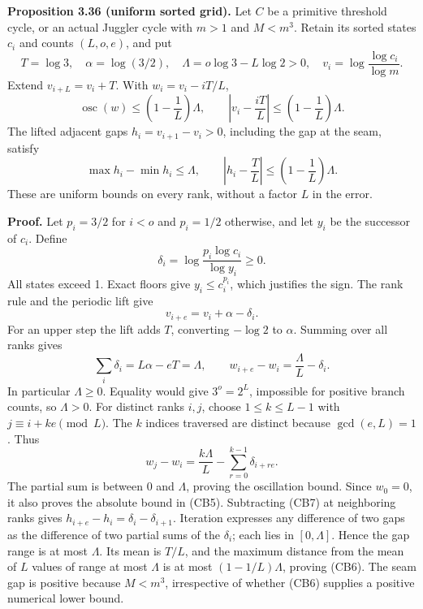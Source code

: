 \documentclass[12pt]{article}
\begin{document}
\textbf{Proposition 3.36 (uniform sorted grid).} Let \(C\) be a
primitive threshold cycle, or an actual Juggler cycle with \(m>1\) and
\(M<m^3\). Retain its sorted states \(c_i\) and counts \((L,o,e)\), and
put \[
T=\log3,\quad \alpha=\log(3/2),\quad
\Lambda=o\log3-L\log2>0,
\quad v_i=\log\frac{\log c_i}{\log m}.
\] Extend \(v_{i+L}=v_i+T\). With \(w_i=v_i-iT/L\), \[
\operatorname{osc}(w)\le\left(1-\frac1L\right)\Lambda,
\qquad
\left|v_i-\frac{iT}{L}\right|
\le\left(1-\frac1L\right)\Lambda.\tag{CB5}
\] The lifted adjacent gaps \(h_i=v_{i+1}-v_i>0\), including the gap at
the seam, satisfy \[
\max h_i-\min h_i\le\Lambda,
\qquad
\left|h_i-\frac TL\right|
\le\left(1-\frac1L\right)\Lambda.\tag{CB6}
\] These are uniform bounds on every rank, without a factor \(L\) in the
error.

\textbf{Proof.} Let \(p_i=3/2\) for \(i<o\) and \(p_i=1/2\) otherwise,
and let \(y_i\) be the successor of \(c_i\). Define \[
\delta_i=\log\frac{p_i\log c_i}{\log y_i}\ge0.
\] All states exceed 1. Exact floors give \(y_i\le c_i^{p_i}\), which
justifies the sign. The rank rule and the periodic lift give \[
v_{i+e}=v_i+\alpha-\delta_i.\tag{CB7}
\] For an upper step the lift adds \(T\), converting \(-\log2\) to
\(\alpha\). Summing over all ranks gives \[
\sum_i\delta_i=L\alpha-eT=\Lambda,
\qquad
w_{i+e}-w_i=\frac\Lambda L-\delta_i.\tag{CB8}
\] In particular \(\Lambda\ge0\). Equality would give \(3^o=2^L\),
impossible for positive branch counts, so \(\Lambda>0\). For distinct
ranks \(i,j\), choose \(1\le k\le L-1\) with \(j\equiv i+ke\pmod L\).
The \(k\) indices traversed are distinct because \(\gcd(e,L)=1\). Thus
\[
w_j-w_i=\frac{k\Lambda}{L}
 -\sum_{r=0}^{k-1}\delta_{i+re}.
\] The partial sum is between 0 and \(\Lambda\), proving the oscillation
bound. Since \(w_0=0\), it also proves the absolute bound in (CB5).
Subtracting (CB7) at neighboring ranks gives
\(h_{i+e}-h_i=\delta_i-\delta_{i+1}\). Iteration expresses any
difference of two gaps as the difference of two partial sums of the
\(\delta_i\); each lies in \([0,\Lambda]\). Hence the gap range is at
most \(\Lambda\). Its mean is \(T/L\), and the maximum distance from the
mean of \(L\) values of range at most \(\Lambda\) is at most
\((1-1/L)\Lambda\), proving (CB6). The seam gap is positive because
\(M<m^3\), irrespective of whether (CB6) supplies a positive numerical
lower bound.
\end{document}
